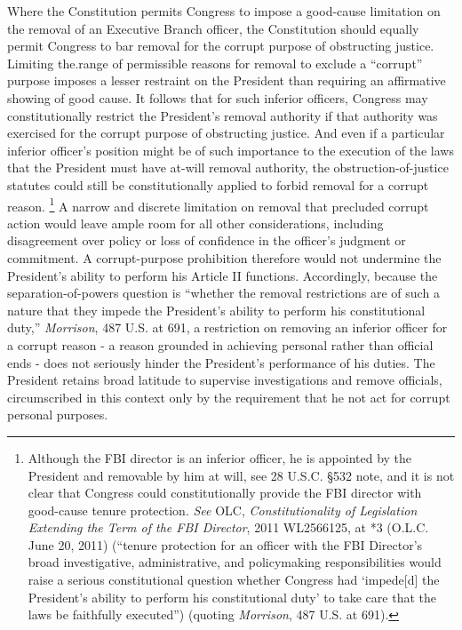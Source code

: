 Where the Constitution permits Congress to impose a good-cause limitation on the removal of an Executive Branch officer, the Constitution should equally permit Congress to bar removal for the corrupt purpose of obstructing justice.
Limiting the.range of permissible reasons for removal to exclude a “corrupt” purpose imposes a lesser restraint on the President than requiring an affirmative showing of good cause.
It follows that for such inferior officers, Congress may constitutionally restrict the President’s removal authority if that authority was exercised for the corrupt purpose of obstructing justice.
And even if a particular inferior officer’s position might be of such importance to the execution of the laws that the President must have at-will removal authority, the obstruction-of-justice statutes could still be constitutionally applied to forbid removal for a corrupt reason.%
\footnote{Although the FBI director is an inferior officer, he is appointed by the President and removable by him at will, see 28 U.S.C. \S 532 note, and it is not clear that Congress could constitutionally provide the FBI director with good-cause tenure protection.
\textit{See} OLC, \textit{Constitutionality of Legislation Extending the Term of the FBI Director}, 2011 WL2566125, at *3 (O.L.C. June 20, 2011) (“tenure protection for an officer with the FBI Director’s broad investigative, administrative, and policymaking responsibilities would raise a serious constitutional question whether Congress had ‘impede[d] the President’s ability to perform his constitutional duty’ to take care that the laws be faithfully executed”) (quoting \textit{Morrison}, 487 U.S. at 691).}
A narrow and discrete limitation on removal that precluded corrupt action would leave ample room for all other considerations, including disagreement over policy or loss of confidence in the officer’s judgment or commitment.
A corrupt-purpose prohibition therefore would not undermine the President’s ability to perform his Article II functions.
Accordingly, because the separation-of-powers question is “whether the removal restrictions are of such a nature that they impede the President’s ability to perform his constitutional duty,” \textit{Morrison}, 487 U.S. at 691, a restriction on removing an inferior officer for a corrupt reason - a reason grounded in achieving personal rather than official ends - does not seriously hinder the President’s performance of his duties.
The President retains broad latitude to supervise investigations and remove officials, circumscribed in this context only by the requirement that he not act for corrupt personal purposes.%
